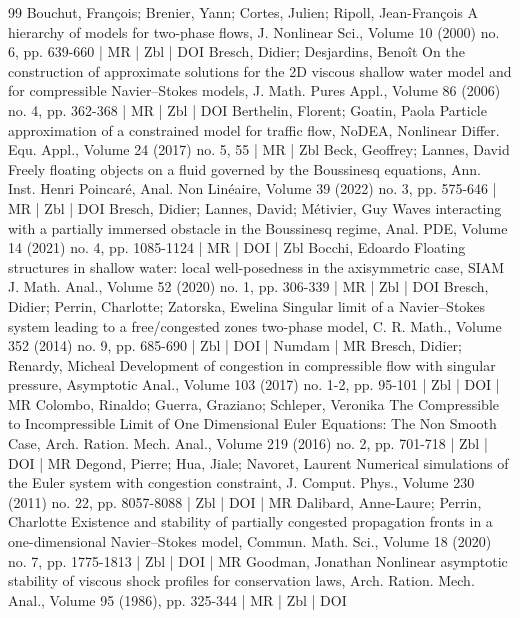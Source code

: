 \documentclass[10pt]{amsart}
\theoremstyle{definition}\newtheorem{defi}[theo]{Definition}\newtheorem{rema}[theo]{Remark}\newtheorem{exam}[theo]{Example}\newtheorem{exem}[theo]{Example}\newtheorem{nota}[theo]{Notation}
\begin{document}
\begin{thebibliography}{99}
 Bouchut, François; Brenier, Yann; Cortes, Julien; Ripoll, Jean-François A hierarchy of models for two-phase flows, J. Nonlinear Sci., Volume 10 (2000) no. 6, pp. 639-660 | MR | Zbl | DOI
 Bresch, Didier; Desjardins, Benoît On the construction of approximate solutions for the 2D viscous shallow water model and for compressible Navier–Stokes models, J. Math. Pures Appl., Volume 86 (2006) no. 4, pp. 362-368 | MR | Zbl | DOI
 Berthelin, Florent; Goatin, Paola Particle approximation of a constrained model for traffic flow, NoDEA, Nonlinear Differ. Equ. Appl., Volume 24 (2017) no. 5, 55 | MR | Zbl
 Beck, Geoffrey; Lannes, David Freely floating objects on a fluid governed by the Boussinesq equations, Ann. Inst. Henri Poincaré, Anal. Non Linéaire, Volume 39 (2022) no. 3, pp. 575-646 | MR | Zbl | DOI
 Bresch, Didier; Lannes, David; Métivier, Guy Waves interacting with a partially immersed obstacle in the Boussinesq regime, Anal. PDE, Volume 14 (2021) no. 4, pp. 1085-1124 | MR | DOI | Zbl
 Bocchi, Edoardo Floating structures in shallow water: local well-posedness in the axisymmetric case, SIAM J. Math. Anal., Volume 52 (2020) no. 1, pp. 306-339 | MR | Zbl | DOI
 Bresch, Didier; Perrin, Charlotte; Zatorska, Ewelina Singular limit of a Navier–Stokes system leading to a free/congested zones two-phase model, C. R. Math., Volume 352 (2014) no. 9, pp. 685-690 | Zbl | DOI | Numdam | MR
 Bresch, Didier; Renardy, Micheal Development of congestion in compressible flow with singular pressure, Asymptotic Anal., Volume 103 (2017) no. 1-2, pp. 95-101 | Zbl | DOI | MR
 Colombo, Rinaldo; Guerra, Graziano; Schleper, Veronika The Compressible to Incompressible Limit of One Dimensional Euler Equations: The Non Smooth Case, Arch. Ration. Mech. Anal., Volume 219 (2016) no. 2, pp. 701-718 | Zbl | DOI | MR
 Degond, Pierre; Hua, Jiale; Navoret, Laurent Numerical simulations of the Euler system with congestion constraint, J. Comput. Phys., Volume 230 (2011) no. 22, pp. 8057-8088 | Zbl | DOI | MR
 Dalibard, Anne-Laure; Perrin, Charlotte Existence and stability of partially congested propagation fronts in a one-dimensional Navier–Stokes model, Commun. Math. Sci., Volume 18 (2020) no. 7, pp. 1775-1813 | Zbl | DOI | MR
 Goodman, Jonathan Nonlinear asymptotic stability of viscous shock profiles for conservation laws, Arch. Ration. Mech. Anal., Volume 95 (1986), pp. 325-344 | MR | Zbl | DOI

\end{thebibliography}
\end{document}
